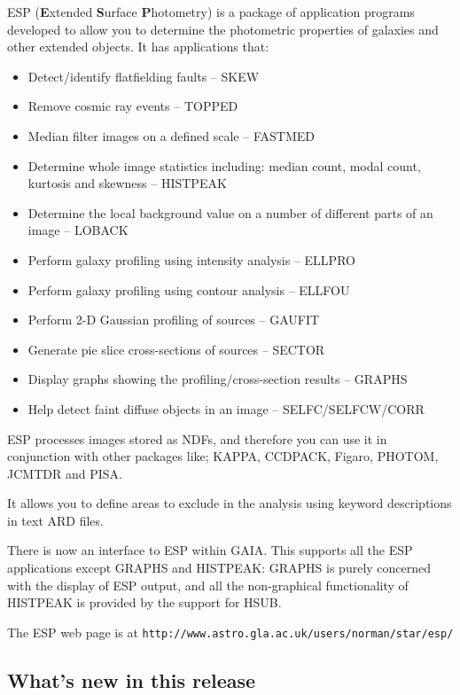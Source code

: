 \documentclass[twoside,11pt]{article}
\newcommand{\htmladdnormallink}[2]{#1}
\newcommand{\xref}[3]{#1}
\newcommand{\xlabel}[1]{}
\begin{document}
ESP ({\bf E}xtended {\bf S}urface {\bf P}hotometry) is a package 
of application programs developed to allow you to determine the photometric 
properties of galaxies and other extended objects. It has applications that:
\begin{itemize}
\item Detect/identify flatfielding faults -- SKEW
\item Remove cosmic ray events -- TOPPED
\item Median filter images on a defined scale -- FASTMED
\item Determine whole image statistics including: median count, modal count,
kurtosis and skewness -- HISTPEAK
\item Determine the local background value on a number of different parts
of an image -- LOBACK
\item Perform galaxy profiling using intensity analysis -- ELLPRO
\item Perform galaxy profiling using contour analysis -- ELLFOU
\item Perform 2-D Gaussian profiling of sources -- GAUFIT
\item Generate pie slice cross-sections of sources -- SECTOR
\item Display graphs showing the profiling/cross-section results -- GRAPHS
\item Help detect faint diffuse objects in an image -- SELFC/SELFCW/CORR
\end{itemize}

ESP processes images stored as NDFs, and therefore you can use it in
conjunction with other packages like; 
\xref{KAPPA}{sun95}{},
\xref{CCDPACK}{sun139}{},
\xref{Figaro}{sun86}{},
\xref{PHOTOM}{sun45}{},
\xref{JCMTDR}{sun132}{}
 and
\xref{PISA}{sun109}{}. 

It allows you to define areas to exclude in the analysis
using keyword descriptions in text ARD files.

There is now an interface to ESP within 
\xref{GAIA}{sun214}{}.  This supports all the ESP applications except
GRAPHS and HISTPEAK: GRAPHS is purely concerned with the display of
ESP output, and all the non-graphical functionality of HISTPEAK is
provided by the support for HSUB.

The ESP web page is at
\htmladdnormallink{\texttt{http://www.astro.gla.ac.uk/users/norman/star/esp/}}{http://www.astro.gla.ac.uk/users/norman/star/esp/}

\subsection{What's new in this release}
\xlabel{WHATSNEW}
\end{document}
